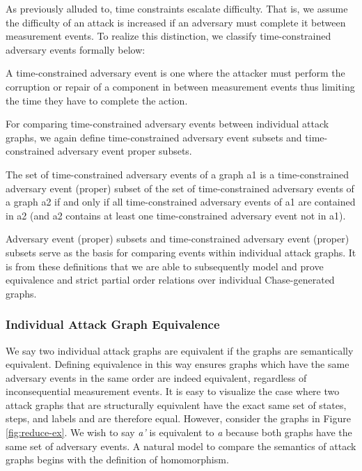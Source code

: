 \documentclass[runningheads]{llncs}
\theoremstyle{definition}
\begin{document}
As previously alluded to, time constraints escalate difficulty. That is, we assume the difficulty of an attack is increased if an adversary must complete it between measurement events. To realize this distinction, we classify time-constrained adversary events formally below:  

\begin{definition}
    A time-constrained adversary event is one where the attacker must perform the corruption or repair of a component in between measurement events thus limiting the time they have to complete the action.  
\end{definition}

\noindent For comparing time-constrained adversary events between individual attack graphs, we again define time-constrained adversary event subsets and time-constrained adversary event proper subsets.
 
 \begin{definition}   
    The set of time-constrained adversary events of a graph a1 is a time-constrained adversary event (proper) subset of the set of time-constrained adversary events of a graph a2 if and only if all time-constrained adversary events of a1 are contained in a2 (and a2 contains at least one time-constrained adversary event not in a1).
 \end{definition}

Adversary event (proper) subsets and time-constrained adversary event (proper) subsets serve as the basis for comparing events within individual attack graphs. It is from these definitions that we are able to subsequently model and prove equivalence and strict partial order relations over individual Chase-generated graphs. 

\subsubsection*{Individual Attack Graph Equivalence}

We say two individual attack graphs are equivalent if the graphs are semantically equivalent. Defining equivalence in this way ensures graphs which have the same adversary events in the same order are indeed equivalent, regardless of inconsequential measurement events. It is easy to visualize the case where two attack graphs that are structurally equivalent have the exact same set of states, steps, and labels and are therefore equal. However, consider the graphs in Figure \ref{fig:reduce-ex}. We wish to say \emph{a'} is equivalent to \emph{a} because both graphs have the same set of adversary events. A natural model to compare the semantics of attack graphs begins with the definition of homomorphism.
\end{document}
